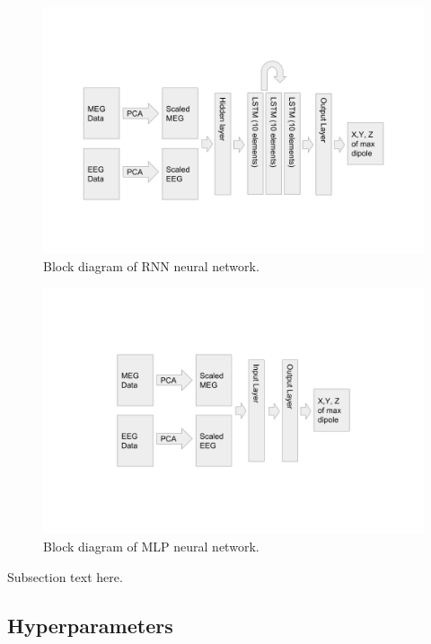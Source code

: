 \documentclass[journal]{IEEEtran}
\begin{document}
\begin{figure}[!t]
\centering
\includegraphics[width=7in]{rnn}
\caption{Block diagram of RNN neural network.}
\label{fig_rnn}
\end{figure}
\begin{figure}[!t]
\centering
\includegraphics[width=7in]{mlp}
\caption{Block diagram of MLP neural network.}
\label{fig_mlp}
\end{figure}

Subsection text here.

\subsection{Hyperparameters}
\end{document}
